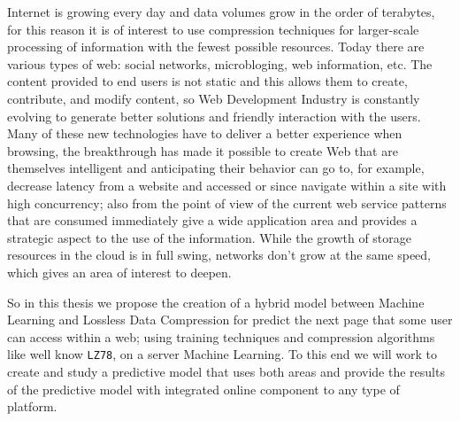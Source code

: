Internet is growing every day and data volumes grow in the order of 
terabytes, for this reason it is of interest to use compression 
techniques for larger-scale processing of information with the fewest 
possible resources. Today there are various types of web: social networks, microbloging, web information, etc. The content provided to end 
users is not static and this allows them to create, contribute, and 
modify content, so Web Development Industry is constantly evolving to generate 
better solutions and friendly interaction with the users. 
Many of these new technologies have to deliver a better experience when browsing, the breakthrough has made it possible to create Web that are themselves intelligent and anticipating their behavior can go to, for example, decrease latency from a website and accessed or since navigate within a site with high concurrency; also from the point of view of the current web service patterns that are consumed immediately give a wide application area and provides a strategic aspect to the use of the information. While the growth of storage resources in the cloud is in full swing, networks don't grow at the same speed, which gives an area of interest to deepen.


So in this thesis we  propose the creation of a hybrid model between Machine Learning and Lossless Data Compression  for predict the next page that some user can access within a web; using training techniques and compression algorithms like well know \texttt{LZ78}, on a server Machine Learning. To this end we will work to create and study a predictive model that uses both areas and provide the results of the predictive model with integrated online component to any type of platform.